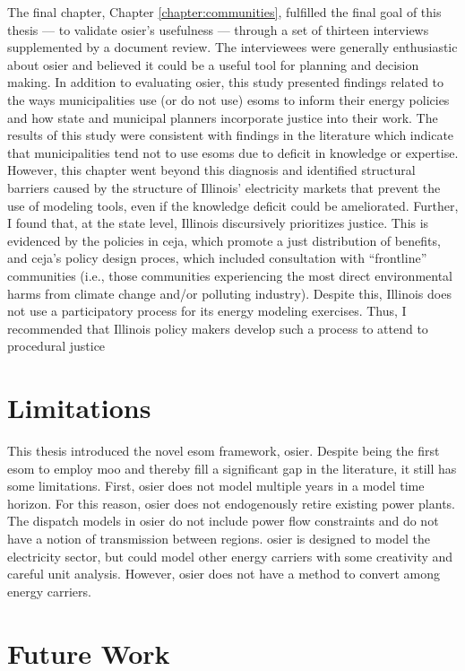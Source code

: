 The final chapter, Chapter \ref{chapter:communities}, fulfilled the final goal
of this thesis --- to validate \ac{osier}'s usefulness --- through a set of
thirteen interviews supplemented by a document review. The interviewees were
generally enthusiastic about \ac{osier} and believed it could be a useful tool
for planning and decision making. In addition to evaluating \ac{osier}, this
study presented findings related to the ways municipalities use (or do not use)
\acp{esom} to inform their energy policies and how state and municipal planners
incorporate justice into their work. The results of this study were consistent
with findings in the literature which indicate that municipalities tend not to
use \acp{esom} due to deficit in knowledge or expertise. However, this chapter
went beyond this diagnosis and identified structural barriers caused by the
structure of Illinois' electricity markets that prevent the use of modeling
tools, even if the knowledge deficit could be ameliorated. Further, I found
that, at the state level, Illinois discursively prioritizes justice. This is
evidenced by the policies in \ac{ceja}, which promote a just distribution of
benefits, and \ac{ceja}'s policy design proces, which included consultation with
``frontline'' communities (i.e., those communities experiencing the most direct
environmental harms from climate change and/or polluting industry). Despite
this, Illinois does not use a participatory process for its energy modeling
exercises. Thus, I recommended that Illinois policy makers develop such a
process to attend to procedural justice 
 
\section{Limitations}
\label{section:conc-limitations}
This thesis introduced the novel \ac{esom} framework, \ac{osier}. Despite
being the first \ac{esom} to employ \ac{moo} and thereby fill a significant
gap in the literature, it still has some limitations. First, \ac{osier} 
does not model multiple years in a model time horizon. For this reason, \ac{osier}
does not endogenously retire existing power plants. The dispatch models in \ac{osier} do 
not include power flow constraints and do not have a notion of transmission between regions.
\ac{osier} is designed to model the electricity sector, but could model other energy carriers
with some creativity and careful unit analysis. However, \ac{osier} does not have a method to 
convert among energy carriers.

\section{Future Work}
\label{section:future-work}

